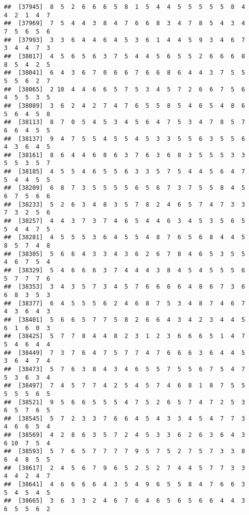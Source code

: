 \documentclass[
]{book}
\begin{document}
\begin{verbatim}
##  [37945]  8  5  2  6  6  6  5  8  1  5  4  4  5  5  5  5  5  8  4  4  2  1  4  7
##  [37969]  7  5  4  4  3  8  4  7  6  6  8  3  4  7  8  5  4  3  4  7  5  6  5  6
##  [37993]  3  3  6  4  4  6  4  5  3  6  1  4  4  5  9  3  4  6  7  3  4  4  7  3
##  [38017]  4  5  6  5  6  3  7  5  4  4  5  6  5  5  2  6  6  6  8  8  5  4  2  5
##  [38041]  6  4  3  6  7  0  6  6  7  6  6  8  6  4  4  3  7  5  5  5  5  6  2  7
##  [38065]  2 10  4  4  6  6  5  7  5  3  4  5  7  2  6  6  7  5  6  4  5  5  3  5
##  [38089]  3  6  2  4  2  7  4  7  6  5  5  8  5  4  6  5  4  8  6  5  6  4  5  8
##  [38113]  8  7  0  5  4  5  3  4  5  6  4  7  5  3  4  7  8  5  7  6  6  4  5  5
##  [38137]  9  4  7  5  5  4  5  5  4  5  3  3  5  5  6  3  5  5  6  4  3  6  4  5
##  [38161]  8  6  4  4  6  8  6  3  7  6  3  6  8  3  5  5  5  3  3  5  5  3  5  7
##  [38185]  4  5  5  4  6  5  5  6  3  3  5  7  5  4  4  5  6  4  7  5  4  4  5  5
##  [38209]  6  8  7  3  5  5  5  5  6  5  6  7  3  7  5  5  8  4  5  6  7  5  6  6
##  [38233]  5  2  6  3  4  8  3  5  7  8  2  4  6  5  7  4  7  3  3  7  3  2  5  6
##  [38257]  4  4  3  7  3  7  4  6  5  4  4  6  3  4  5  3  5  6  5  5  4  4  7  5
##  [38281]  4  5  5  5  3  6  4  5  5  4  8  7  6  5  6  8  4  4  5  8  5  7  4  8
##  [38305]  5  6  6  4  3  3  4  3  6  2  6  7  8  4  6  5  3  5  5  4  6  7  5  4
##  [38329]  5  4  6  6  6  3  7  4  4  4  3  8  4  5  4  5  5  5  6  5  7  7  7  6
##  [38353]  3  4  3  5  7  3  4  5  7  6  6  6  6  4  8  6  7  3  6  6  8  3  5  3
##  [38377]  6  4  5  5  5  6  2  4  6  8  7  5  3  4  8  7  4  6  7  4  3  6  4  3
##  [38401]  5  6  6  5  7  7  5  8  2  6  6  4  3  4  2  3  4  4  5  6  1  6  0  3
##  [38425]  5  7  7  8  4  4  8  2  3  1  2  3  6  6  6  5  1  4  7  5  4  6  4  4
##  [38449]  7  3  7  6  4  7  5  7  7  4  7  6  6  6  3  6  4  4  5  3  6  4  7  4
##  [38473]  5  7  6  3  8  4  3  4  6  5  5  7  5  5  6  7  5  4  7  5  3  6  3  4
##  [38497]  7  4  5  7  7  4  2  5  4  5  7  4  6  8  1  8  7  5  5  5  5  5  6  5
##  [38521]  9  5  6  6  5  5  5  4  7  5  2  6  5  7  4  7  2  5  3  6  5  7  6  5
##  [38545]  5  7  2  3  3  7  6  6  4  5  4  3  3  4  5  4  7  7  3  4  6  6  5  4
##  [38569]  4  2  8  6  3  5  7  2  4  5  3  3  6  2  6  3  6  4  3  6 10  7  5  4
##  [38593]  5  7  6  5  7  7  7  7  9  5  7  5  2  7  5  7  3  3  8  6  4  8  5  5
##  [38617]  2  4  5  6  7  9  6  5  2  5  2  7  4  4  5  7  7  3  3  4  4  2  4  7
##  [38641]  4  6  6  6  6  4  3  5  4  9  6  5  5  8  4  7  6  6  3  5  4  5  4  5
##  [38665]  3  6  3  3  2  4  6  7  6  4  6  5  6  5  6  6  4  4  3  6  5  5  6  2

\end{verbatim}
\end{document}
